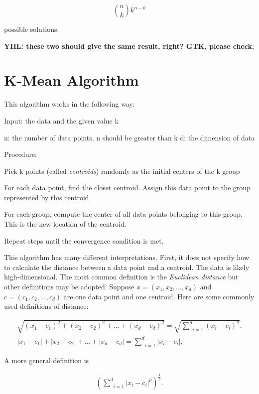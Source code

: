 \begin{equation}
  \binom{n}{k} k^{n-k}
\end{equation}

possible solutions.

{\bf YHL: these two should give the same result, right? GTK, please check.}


\section{K-Mean Algorithm}


This algorithm works in the
following way: 

Input: the data and the given value k

n: the number of data points, n should be greater than k
d: the dimension of data

Procedure:

Pick k points (called {\it centroids}) randomly as the initial centers of the k group

For each data point, find the closet centroid. Assign this data point to the group represented by this centroid.

For each group, compute the center of all data points belonging to this group. This is the new location of the centroid.

Repeat steps until the convergence condition is met.


This algorithm has many different interpretations. First, it does not
specify how to calculate the distance between a data point and a
centroid.  The data is likely high-dimensional.  The most common
definition is the {\it Euclidean distance} but other definitions may
be adopted.  Suppose $x = (x_1, x_2, ..., x_d)$ and $c = (c_1, c_2,
..., c_d)$ are one data point and one centroid.  Here are some
commonly used definitions of distance:

\begin{gather}
  \sqrt{(x_1 - c_1) ^ 2 + (x_2 - c_2) ^ 2 + ... + (x_d - c_d) ^ 2} = \sqrt{\underset{i=1}{\overset{d}{\sum}} (x_i - c_i) ^ 2}.
  \label{equ:EuclideanDistance}
    \\
    |x_1 - c_1 |  + | x_2 - c_2 |  + ... + | x_d - c_d | = \underset{i=1}{\overset{d}{\sum}} |x_i - c_i|.
    \label{equ:1NormDistance}
\end{gather}

A more general definition is

\begin{gather}
  (\underset{i=1}{\overset{d}{\sum}} |x_i - c_i| ^ p) ^ {\frac{1}{p}}.
\end{gather}

